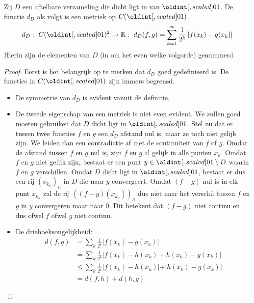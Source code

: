 \documentclass[main.tex]{subfiles}
\begin{document}
\begin{vb}
  Zij $D$ een aftelbare verzameling die dicht ligt in van $\interval{0}{1}$.
  De functie $d_{D}$ als volgt is een metriek op $C(\interval{0}{1})$.
  \[ d_{D}:\ C(\interval{0}{1})^{2} \rightarrow \mathbb{R}:\ d_{D}(f,g) = \sum_{k=1}^{\infty}\frac{1}{2^{k}}\left| f(x_{k}) - g(x_{k})\right| \]
  Hierin zijn de elementen van $D$ (in om het even welke volgorde) genummerd.
  
  \begin{proof}
    Eerst is het belangrijk op te merken dat $d_{D}$ goed gedefinieerd is.
    De functies in $C(\interval{0}{1})$ zijn immers begrensd.
    \begin{itemize}
    \item De symmetrie van $d_{D}$ is evident vanuit de definitie.
    \item De tweede eigenschap van een metriek is niet even evident.
      We zullen goed moeten gebruiken dat $D$ dicht ligt in $\interval{0}{1}$.
      Stel nu dat er tussen twee functies $f$ en $g$ een $d_{D}$ afstand nul is, maar ze toch niet gelijk zijn.
      We leiden dan een contradictie af met de continuiteit van $f$ of $g$.
      Omdat de afstand tussen $f$ en $g$ nul is, zijn $f$ en $g$ al gelijk in alle punten $x_{k}$.
      Omdat $f$ en $g$ niet gelijk zijn, bestaat er een punt $y\in \interval{0}{1} \setminus D$ waarin $f$ en $g$ verschillen.
      Omdat $D$ dicht ligt in $\interval{0}{1}$, bestaat er dus een rij $(x_{k_{n}})_{n}$ in $D$ die naar $y$ convergeert.
      Omdat $(f-g)$ nul is in elk punt $x_{k_{n}}$ zal de rij $((f-g)(x_{k_{n}}))_{n}$ dus niet naar het verschil tussen $f$ en $g$ in $y$ convergeren maar naar $0$.
      Dit betekent dat $(f-g)$ niet continu en dus ofwel $f$ ofwel $g$ niet continu.
    \item De driehoeksongelijkheid:
      \begin{align*}
        d(f,g)
        &= \sum_{k}\frac{1}{2^{k}}\left| f(x_{k}) - g(x_{k})\right|\\
        &= \sum_{k}\frac{1}{2^{k}}\left| f(x_{k}) - h(x_{k}) + h(x_{k}) - g(x_{k})\right|\\
        &\le \sum_{k}\frac{1}{2^{k}}\left| f(x_{k}) - h(x_{k})| + |h(x_{k}) - g(x_{k})\right|\\
        &= d(f,h) + d(h,g)
      \end{align*}
    \end{itemize}
  \end{proof}
\end{vb}
\end{document}
